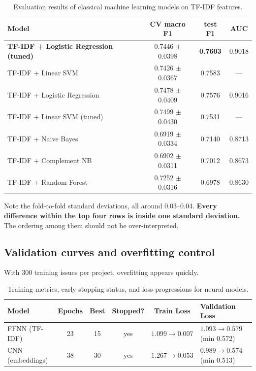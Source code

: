 \begin{table}[H]
\centering
\caption{Evaluation results of classical machine learning models on TF-IDF features.}
\label{tab:classical_models_results}
\vspace{0.5em}
\begin{tabular}{l c c c}
\hline
Model & CV macro F1 & test F1 & AUC \\
\hline
\textbf{TF-IDF + Logistic Regression (tuned)} & 0.7446 $\pm$ 0.0398 & \textbf{0.7603} & 0.9018 \\
TF-IDF + Linear SVM & 0.7426 $\pm$ 0.0367 & 0.7583 & --- \\
TF-IDF + Logistic Regression & 0.7478 $\pm$ 0.0409 & 0.7576 & 0.9016 \\
TF-IDF + Linear SVM (tuned) & 0.7499 $\pm$ 0.0430 & 0.7531 & --- \\
TF-IDF + Naive Bayes & 0.6919 $\pm$ 0.0334 & 0.7140 & 0.8713 \\
TF-IDF + Complement NB & 0.6902 $\pm$ 0.0311 & 0.7012 & 0.8673 \\
TF-IDF + Random Forest & 0.7252 $\pm$ 0.0316 & 0.6978 & 0.8630 \\
\hline
\end{tabular}
\end{table}

Note the fold-to-fold standard deviations, all around 0.03--0.04. \textbf{Every difference within the top four rows is inside one standard deviation.} The ordering among them should not be over-interpreted.

\subsection{Validation curves and overfitting control}

With 300 training issues per project, overfitting appears quickly.

\begin{table}[H]
\centering
\caption{Training metrics, early stopping status, and loss progressions for neural models.}
\label{tab:neural_training_progression}
\vspace{0.5em}
\begin{tabular}{l c c c c p{4.2cm}}
\hline
Model & Epochs & Best & Stopped? & Train Loss & Validation Loss \\
\hline
FFNN (TF-IDF) & 23 & 15 & yes & $1.099 \rightarrow 0.007$ & $1.093 \rightarrow 0.579$ (min 0.572) \\
CNN (embeddings) & 38 & 30 & yes & $1.267 \rightarrow 0.053$ & $0.989 \rightarrow 0.574$ (min 0.513) \\
\hline
\end{tabular}
\end{table}

